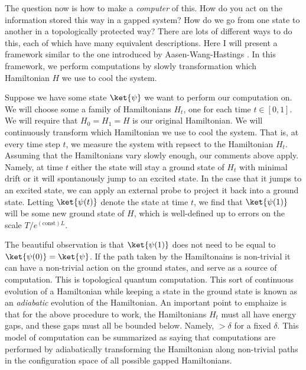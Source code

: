 The question now is how to make a \textit{computer} of this. How do you act on the information stored this way in a gapped system? How do we go from one state to another in a topologically protected way? There are lots of different ways to do this, each of which have many equivalent descriptions. Here I will present a framework similar to the one introduced by Aasen-Wang-Hastings \cite{aasen2022adiabatic}. In this framework, we perform computations by slowly transformation which Hamiltonian $H$ we use to cool the system.

Suppose we have some state $\ket{\psi}$ we want to perform our computation on. We will choose some a family of Hamiltonians $H_t$, one for each time $t\in [0,1]$. We will require that $H_0=H_1=H$ is our original Hamiltonian. We will continuously transform which Hamiltonian we use to cool the system. That is, at every time step $t$, we measure the system with repsect to the Hamiltonian $H_t$. Assuming that the Hamiltonians vary slowly enough, our comments above apply. Namely, at time $t$ either the state will stay a ground state of $H_t$ with minimal drift or it will spontanously jump to an excited state. In the case that it jumps to an excited state, we can apply an external probe to project it back into a ground state. Letting $\ket{\psi(t)}$ denote the state at time $t$, we find that $\ket{\psi(1)}$ will be some new ground state of $H$, which is well-defined up to errors on the scale $T/e^{(\text{const})L}$.

The beautiful observation is that $\ket{\psi(1)}$ does not need to be equal to $\ket{\psi(0)}=\ket{\psi}$. If the path taken by the Hamiltonains is non-trivial it can have a non-trivial action on the ground states, and serve as a source of computation. This is topological quantum computation. This sort of continuous evolution of a Hamiltonian while keeping a state in the ground state is known as an \textit{adiabatic} evolution of the Hamiltonian. An important point to emphaize is that for the above procedure to work, the Hamiltonians $H_t$ must all have energy gaps, and these gaps must all be bounded below. Namely, $>\delta$ for a fixed $\delta$. This model of computation can be summarized as saying that computations are performed by adiabatically transforming the Hamiltonian along non-trivial paths in the configuration space of all possible gapped Hamiltonians.

